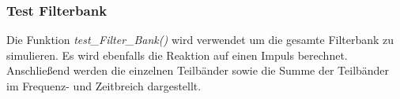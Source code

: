 \subsubsection{Test Filterbank}\label{sec:impl_testBank}
Die Funktion \emph{test\_Filter\_Bank()} wird verwendet um die gesamte Filterbank zu simulieren. Es wird ebenfalls die Reaktion auf einen Impuls berechnet. Anschließend werden die einzelnen Teilbänder sowie die Summe der Teilbänder im Frequenz- und Zeitbreich dargestellt.


